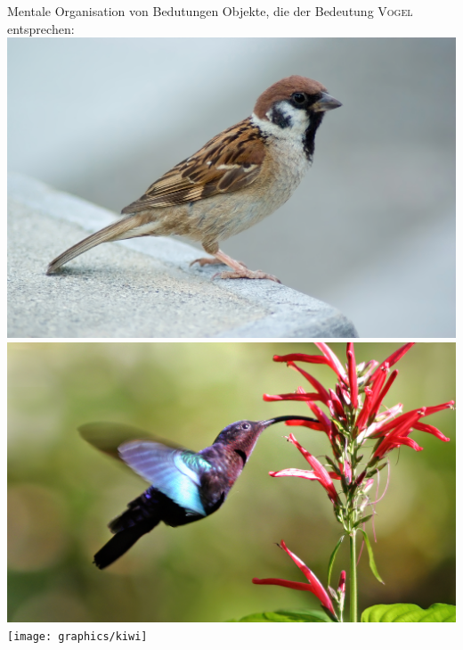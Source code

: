 \begin{frame}
  {Mentale Organisation von Bedutungen}
  Objekte, die der Bedeutung \alert{\textsc{Vogel}} entsprechen:\\
  \Zeile
  \centering 
  \includegraphics[height=0.3\textheight]{graphics/spatz}
  \includegraphics[height=0.3\textheight]{graphics/kolibri}
  \texttt{[image: graphics/kiwi]}
\end{frame}

